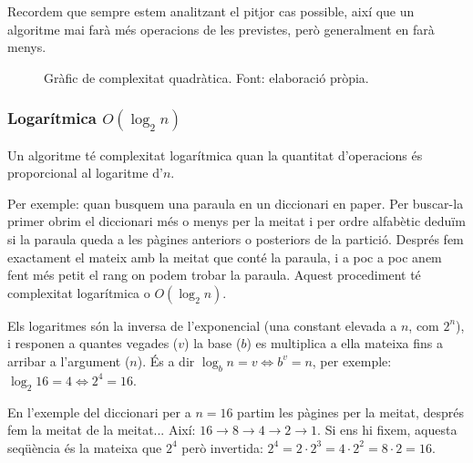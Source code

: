 Recordem que sempre estem analitzant el pitjor cas possible, així que un algoritme mai farà més operacions de les previstes, però generalment en farà menys.

\begin{figure}[H]
    \centering
{}
    \caption[Gràfic de complexitat quadràtica.]{Gràfic de complexitat quadràtica. Font: elaboració pròpia.}
    \label{fig:my_label}
\end{figure}

\subsubsection*{Logarítmica $O(\log_2{n})$}
Un algoritme té complexitat logarítmica quan la quantitat d'operacions és proporcional al logaritme d'$n$.

Per exemple: quan busquem una paraula en un diccionari en paper. Per buscar-la primer obrim el diccionari més o menys per la meitat i per ordre alfabètic deduïm si la paraula queda a les pàgines anteriors o posteriors de la partició. Després fem exactament el mateix amb la meitat que conté la paraula, i a poc a poc anem fent més petit el rang on podem trobar la paraula. Aquest procediment té complexitat logarítmica o $O(\log_2{n})$.

Els logaritmes són la inversa de l'exponencial (una constant elevada a $n$, com $2^n$), i responen a quantes vegades ($v$) la base ($b$) es multiplica a ella mateixa fins a arribar a l'argument ($n$). És a dir $\log_b{n} = v \iff b^v = n$, per exemple: $\log_2{16} = 4 \iff 2^4 = 16$. 

En l'exemple del diccionari per a $n = 16$ partim les pàgines per la meitat, després fem la meitat de la meitat... Així: $16 \rightarrow 8 \rightarrow 4 \rightarrow 2 \rightarrow 1$. Si ens hi fixem, aquesta seqüència és la mateixa que $2^4$ però invertida: $2^4 = 2 \cdot 2^3 = 4 \cdot 2^2 = 8 \cdot 2 = 16$. 

